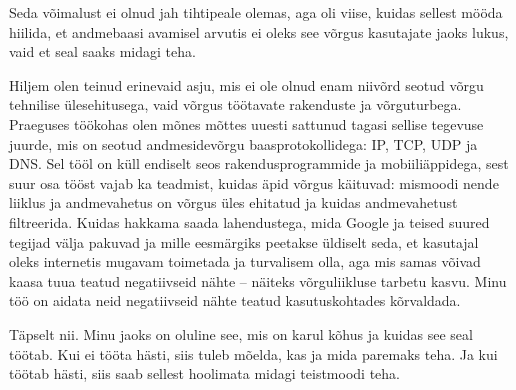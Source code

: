 
Seda võimalust ei olnud jah tihtipeale olemas, aga oli viise, kuidas 
sellest mööda hiilida, et andmebaasi avamisel arvutis ei oleks see võrgus kasutajate jaoks lukus, vaid et seal saaks midagi 
teha. 


Hiljem olen teinud erinevaid asju, mis ei ole olnud enam niivõrd seotud
võrgu tehnilise ülesehitusega, vaid võrgus 
töötavate rakenduste ja võrguturbega. Praeguses töökohas olen mõnes mõttes uuesti
sattunud tagasi sellise tegevuse juurde, mis on seotud andmesidevõrgu 
baasprotokollidega: IP, TCP, UDP ja DNS. Sel tööl on küll
endiselt seos rakendusprogrammide ja mobiiliäppidega, 
sest suur osa tööst vajab ka teadmist, kuidas äpid võrgus käituvad: mismoodi 
nende liiklus ja andmevahetus on võrgus üles ehitatud ja kuidas 
andmevahetust filtreerida. Kuidas hakkama saada lahendustega, 
mida Google ja teised suured tegijad välja pakuvad ja mille eesmärgiks 
peetakse üldiselt seda, et kasutajal oleks internetis mugavam toimetada ja turvalisem olla, aga mis samas võivad kaasa tuua
teatud negatiivseid nähte -- näiteks võrguliikluse tarbetu kasvu. Minu töö on 
aidata neid negatiivseid nähte teatud kasutuskohtades kõrvaldada.


Täpselt nii. Minu jaoks on oluline see, mis on karul kõhus ja kuidas see 
seal töötab. Kui ei tööta hästi, siis tuleb mõelda, kas ja mida paremaks teha. Ja 
kui töötab hästi, siis saab sellest hoolimata midagi teistmoodi teha.

